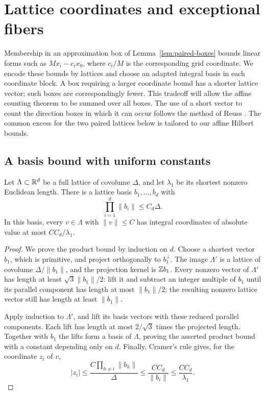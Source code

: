 \section{Lattice coordinates and exceptional fibers}\label{sec:lattice-boxes}

Membership in an approximation box of Lemma~\ref{lem:paired-boxes}
bounds linear forms such as $Mx_i-c_ix_0$, where $c_i/M$ is the
corresponding grid coordinate. We encode these bounds by lattices and
choose an adapted integral basis in each coordinate block. A box
requiring a larger coordinate bound has a shorter lattice vector;
such boxes are correspondingly fewer. This tradeoff will allow the
affine counting theorem to be summed over all boxes.
The use of a short vector to count the direction boxes in which it
can occur follows the method of Reuss
\cite[Sections~5--6]{Reuss2015PowerFree}. The common excess for the
two paired lattices below is tailored to our affine Hilbert bounds.

\subsection{A basis bound with uniform constants}

\begin{lemma}\label{lem:lattice-basis}
Let $\Lambda\subset\mathbb R^d$ be a full lattice of covolume $\Delta$,
and let $\lambda_1$ be its shortest nonzero Euclidean length.
There is a lattice basis $b_1,\ldots,b_d$ with
\[
 \prod_{i=1}^d\|b_i\|\le C_d\Delta.
\]
In this basis, every $v\in\Lambda$ with $\|v\|\le C$ has integral
coordinates of absolute value at most $CC_d/\lambda_1$.
\end{lemma}

\begin{proof}
We prove the product bound by induction on $d$. Choose a shortest
vector $b_1$, which is primitive, and project orthogonally to
$b_1^\perp$. The image $\Lambda'$ is a lattice of covolume
$\Delta/\|b_1\|$, and the projection kernel is $\mathbb Z b_1$.
Every nonzero vector of $\Lambda'$ has length at least
$\sqrt3\|b_1\|/2$: lift it and subtract an integer multiple of
$b_1$ until its parallel component has length at most $\|b_1\|/2$;
the resulting nonzero lattice vector still has length at least
$\|b_1\|$.

Apply induction to $\Lambda'$, and lift its basis vectors with
these reduced parallel components. Each lift has length at most
$2/\sqrt3$ times the projected length. Together with $b_1$ the
lifts form a basis of $\Lambda$, proving the asserted product
bound with a constant depending only on $d$. Finally, Cramer's
rule gives, for the coordinate $z_i$ of $v$,
\[
 |z_i|\le
 \frac{C\prod_{h\ne i}\|b_h\|}{\Delta}
 \le \frac{CC_d}{\|b_i\|}
 \le \frac{CC_d}{\lambda_1}.
\]
\end{proof}

